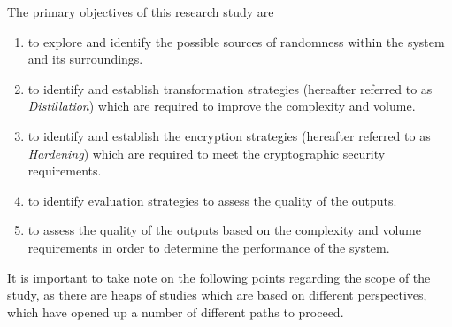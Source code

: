 The primary objectives of this research study are
\begin{enumerate}
    \item to explore and identify the possible sources of randomness within the system and its surroundings.
    
    \item to identify and establish transformation strategies (hereafter referred to as \textit{Distillation}) which are required to improve the complexity and volume.
    
    \item to identify and establish the encryption strategies (hereafter referred to as \textit{Hardening}) which are required to meet the cryptographic security requirements.
    
    \item to identify evaluation strategies to assess the quality of the outputs.
    
    \item to assess the quality of the outputs based on the complexity and volume requirements in order to determine the performance of the system.
\end{enumerate}

It is important to take note on the following points regarding the scope of the study, as there are heaps of studies which are based on different perspectives, which have opened up a number of different paths to proceed.

